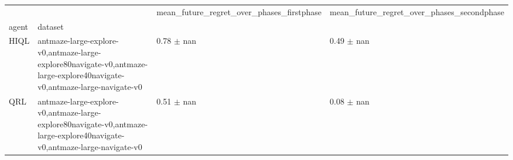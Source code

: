 \begin{tabular}{llll}
\toprule
 &  & mean_future_regret_over_phases_firstphase & mean_future_regret_over_phases_secondphase \\
agent & dataset &  &  \\
\midrule
HIQL & antmaze-large-explore-v0,antmaze-large-explore80navigate-v0,antmaze-large-explore40navigate-v0,antmaze-large-navigate-v0 & 0.78 $\pm$ nan & 0.49 $\pm$ nan \\
\cline{1-4}
QRL & antmaze-large-explore-v0,antmaze-large-explore80navigate-v0,antmaze-large-explore40navigate-v0,antmaze-large-navigate-v0 & 0.51 $\pm$ nan & 0.08 $\pm$ nan \\
\cline{1-4}
\bottomrule
\end{tabular}
